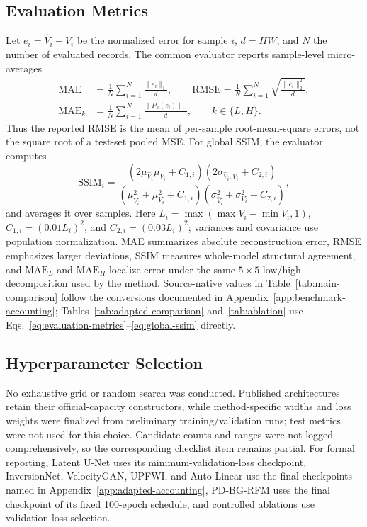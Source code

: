 \documentclass[letterpaper]{article}
\begin{document}
\subsection{Evaluation Metrics}
Let $e_i=\hat V_i-V_i$ be the normalized error for sample $i$, $d=HW$, and $N$ the number of evaluated records. The common evaluator reports sample-level micro-averages
\begin{align}
\mathrm{MAE}
&=\frac{1}{N}\sum_{i=1}^{N}\frac{\|e_i\|_1}{d},\qquad
\mathrm{RMSE}
=\frac{1}{N}\sum_{i=1}^{N}\sqrt{\frac{\|e_i\|_2^2}{d}},\nonumber\\
\mathrm{MAE}_{k}
&=\frac{1}{N}\sum_{i=1}^{N}\frac{\|P_k(e_i)\|_1}{d},
\qquad k\in\{L,H\}.
\label{eq:evaluation-metrics}
\end{align}
Thus the reported RMSE is the mean of per-sample root-mean-square errors, not the square root of a test-set pooled MSE. For global SSIM, the evaluator computes
\begin{equation}
\mathrm{SSIM}_i=
\frac{(2\mu_{\hat V_i}\mu_{V_i}+C_{1,i})(2\sigma_{\hat V_i,V_i}+C_{2,i})}
{(\mu_{\hat V_i}^2+\mu_{V_i}^2+C_{1,i})(\sigma_{\hat V_i}^2+\sigma_{V_i}^2+C_{2,i})},
\label{eq:global-ssim}
\end{equation}
and averages it over samples. Here $L_i=\max(\max V_i-\min V_i,1)$, $C_{1,i}=(0.01L_i)^2$, and $C_{2,i}=(0.03L_i)^2$; variances and covariance use population normalization. MAE summarizes absolute reconstruction error, RMSE emphasizes larger deviations, SSIM measures whole-model structural agreement, and $\mathrm{MAE}_L$ and $\mathrm{MAE}_H$ localize error under the same $5\times5$ low/high decomposition used by the method. Source-native values in Table~\ref{tab:main-comparison} follow the conversions documented in Appendix~\ref{app:benchmark-accounting}; Tables~\ref{tab:adapted-comparison} and~\ref{tab:ablation} use Eqs.~\ref{eq:evaluation-metrics}--\ref{eq:global-ssim} directly.

\subsection{Hyperparameter Selection}
No exhaustive grid or random search was conducted. Published architectures retain their official-capacity constructors, while method-specific widths and loss weights were finalized from preliminary training/validation runs; test metrics were not used for this choice. Candidate counts and ranges were not logged comprehensively, so the corresponding checklist item remains partial. For formal reporting, Latent U-Net uses its minimum-validation-loss checkpoint, InversionNet, VelocityGAN, UPFWI, and Auto-Linear use the final checkpoints named in Appendix~\ref{app:adapted-accounting}, PD-BG-RFM uses the final checkpoint of its fixed 100-epoch schedule, and controlled ablations use validation-loss selection.
\end{document}
